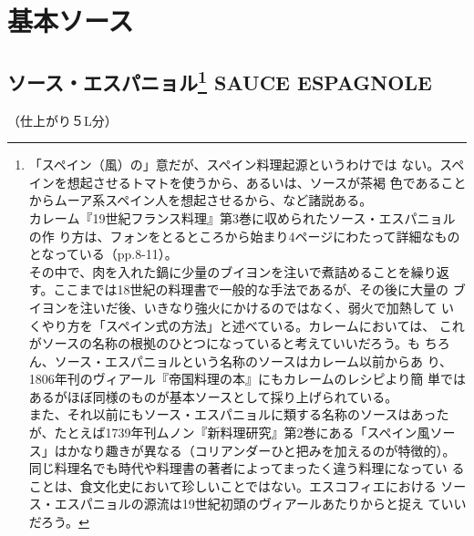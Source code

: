 \documentclass[twoside,12Q,b5paper]{escoffierltjsbook}
\date{}
\newenvironment{recette}{\begin{multicols}{2}}{\end{multicols}}
\renewcommand{\thechapter}{}
\renewcommand{\thesection}{}
\begin{document}





\section{基本ソース}\label{ux57faux672cux30bdux30fcux30b9}

\begin{recette}

\subsection[ソース・エスパニョル SAUCE
ESPAGNOLE]{\texorpdfstring{ソース・エスパニョル\footnote{「スペイン（風）の」意だが、スペイン料理起源というわけでは
  ない。スペインを想起させるトマトを使うから、あるいは、ソースが茶褐
  色であることからムーア系スペイン人を想起させるから、など諸説ある。\\
  カレーム『19世紀フランス料理』第3巻に収められたソース・エスパニョルの作
  り方は、フォンをとるところから始まり4ページにわたって詳細なものとなっている（pp.8-11）。\\
  その中で、肉を入れた鍋に少量のブイヨンを注いで煮詰めることを繰り返
  す。ここまでは18世紀の料理書で一般的な手法であるが、その後に大量の
  ブイヨンを注いだ後、いきなり強火にかけるのではなく、弱火で加熱して
  いくやり方を「スペイン式の方法」と述べている。カレームにおいては、
  これがソースの名称の根拠のひとつになっていると考えていいだろう。も
  ちろん、ソース・エスパニョルという名称のソースはカレーム以前からあ
  り、1806年刊のヴィアール『帝国料理の本』にもカレームのレシピより簡
  単ではあるがほぼ同様のものが基本ソースとして採り上げられている。\\
  また、それ以前にもソース・エスパニョルに類する名称のソースはあった
  が、たとえば1739年刊ムノン『新料理研究』第2巻にある「スペイン風ソー
  ス」はかなり趣きが異なる（コリアンダーひと把みを加えるのが特徴的）。
  同じ料理名でも時代や料理書の著者によってまったく違う料理になってい
  ることは、食文化史において珍しいことではない。エスコフィエにおける
  ソース・エスパニョルの源流は19世紀初頭のヴィアールあたりからと捉え
  ていいだろう。} SAUCE
ESPAGNOLE}{ソース・エスパニョル SAUCE ESPAGNOLE}}\label{ux30bdux30fcux30b9ux30a8ux30b9ux30d1ux30cbux30e7ux30eb102008-sauce-espagnole}

（仕上がり５L分）


\end{recette}
\end{document}
